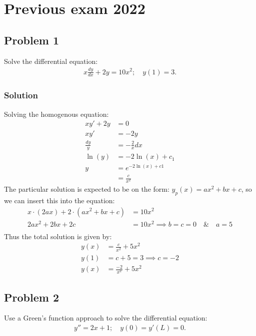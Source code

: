 \section{Previous exam 2022}

\subsection*{Problem 1}
Solve the differential equation:
\begin{align*}
    x\frac{dy}{dx} + 2y = 10x^2; \quad y(1) = 3.
\end{align*}

\subsubsection*{Solution}
Solving the homogenous equation:
\begin{align*}
    x y' + 2y &= 0\\
    xy' &= -2y\\
    \frac{dy}{y} &= -\frac{2}{x}dx\\
    \ln(y) &= -2\ln(x) + c_1\\
    y &= e^{-2\ln(x) + c1}\\
    &= \frac{c}{x^2}
\end{align*}The particular solution is expected to be on the form: $y_p(x) = ax^2 + bx + c$, so we can insert this into the equation:
\begin{align*}
    x\cdot(2ax) + 2 \cdot(ax^2  + bx + c) &= 10x^2\\ 
    2ax^2 + 2bx + 2c &= 10x^2\implies b = c = 0\quad \&\quad a = 5\\
\end{align*}Thus the total solution is given by:
\begin{align*}
   y(x) &= \frac{c}{x^2} + 5x^2 \\
   y(1) &= c + 5 = 3 \implies c = -2\\
   y(x) &= \frac{-2}{x^2} + 5x^2
\end{align*}

\subsection*{Problem 2}
Use a Green's function approach to solve the differential equation:
\begin{align*}
    y'' = 2x + 1; \quad y(0) = y'(L) = 0.
\end{align*}
